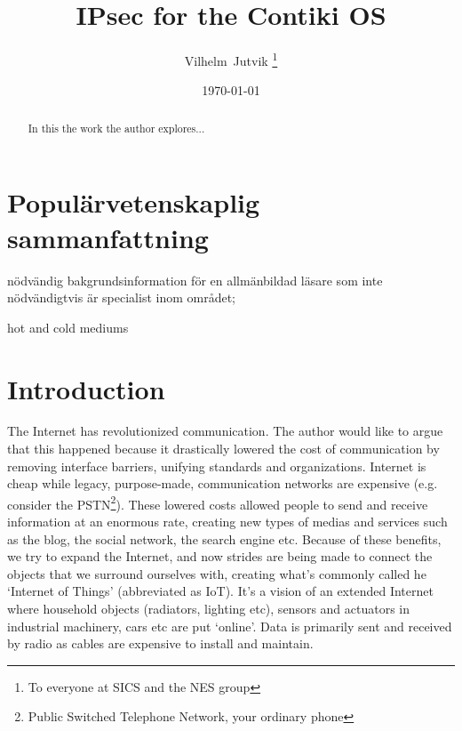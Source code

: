 \documentclass[final,letterpaper,twoside,12pt,twocolumn]{report}
\begin{document}
\author{Vilhelm~Jutvik \thanks{To everyone at SICS and the NES group}}
\date{\today}
\title{IPsec for the Contiki OS}

\maketitle

% 
% 

\begin{abstract}
In this the work the author explores...
\end{abstract}

\tableofcontents

\chapter{Populärvetenskaplig sammanfattning}
nödvändig bakgrundsinformation för en allmänbildad läsare som inte nödvändigtvis är specialist inom området;

hot and cold mediums

\chapter{Introduction}
The Internet has revolutionized communication. The author would like to argue that this happened because it drastically lowered the cost of communication by removing interface barriers, unifying standards and organizations. Internet is cheap while legacy, purpose-made, communication networks are expensive (e.g. consider the PSTN\footnote{Public Switched Telephone Network, your ordinary phone}). These lowered costs allowed people to send and receive information at an enormous rate, creating new types of medias and services such as the blog, the social network, the search engine etc. Because of these benefits, we try to expand the Internet, and now strides are being made to connect the objects that we surround ourselves with, creating what's commonly called he `Internet of Things' (abbreviated as IoT). It's a vision of an extended Internet where household objects (radiators, lighting etc), sensors and actuators in industrial machinery, cars etc are put `online'. Data is primarily sent and received by radio as cables are expensive to install and maintain.
\end{document}
